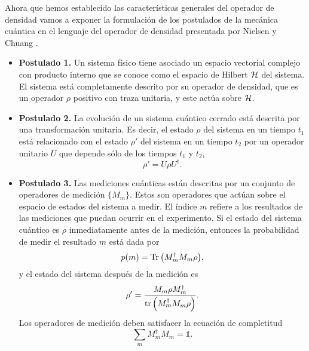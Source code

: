 Ahora que hemos establecido las características generales del 
operador de densidad vamos a exponer la formulación
de  los postulados de la mecánica cuántica en el lenguaje del 
operador de densidad presentada por 
Nielsen y Chuang \cite{nielsen_chuang_2011}.
\begin{itemize}
	\item[] \textbf{Postulado 1.} Un sistema físico tiene asociado un espacio vectorial complejo
	con producto interno que se conoce como el espacio de Hilbert $\mathcal{H}$ del
	sistema. El sistema está completamente descrito por su operador de densidad,
	que es un operador $\rho$ positivo con traza unitaria, y este actúa sobre 
	$\mathcal{H}$. 
	\item[] \textbf{Postulado 2.} La evolución de un sistema cuántico cerrado está descrita por una transformación
	unitaria. Es decir, el estado $\rho$ del sistema en un tiempo $t_1$ está 
	relacionado con el estado $\rho'$ del sistema en un tiempo $t_2$ por un operador
	unitario $U$ que depende sólo de los tiempos $t_1$ y $t_2$,
	\begin{equation}
	\rho'=U\rho U^{\dagger}.
	\label{eq:postulate1}
	\end{equation}
	\item[] \textbf{Postulado 3.} Las mediciones cuánticas están descritas
por un conjunto de 
	operadores de medición $\{M_m\}$. Estos son operadores que actúan sobre el espacio 
	de estados del sistema a medir. El índice $m$ refiere a los resultados
	de las mediciones que puedan ocurrir en el experimento. Si el estado del sistema
	cuántico es $\rho$ inmediatamente antes de la medición, entonces la probabilidad
	de medir el resultado $m$ está dada por
	\begin{equation}
	p(m)=\Tr \qty(M_m^{\dagger}M_m\rho),
	\label{eq:postulate2_prob}
	\end{equation}						
	y el estado del sistema después de la medición es
	\begin{equation}
	\rho'=\frac{M_m\rho M_m^{\dagger}}{\tr \qty(M_m^{\dagger}M_m\rho)}.
	\label{eq:postulate2_rhoPrime}
	\end{equation}	
	Los operadores de medición deben satisfacer la ecuación de completitud
	\begin{equation}
	\sum _m M_m^{\dagger}M_m=\mathbb{1}.

\end{equation}
\end{itemize}
